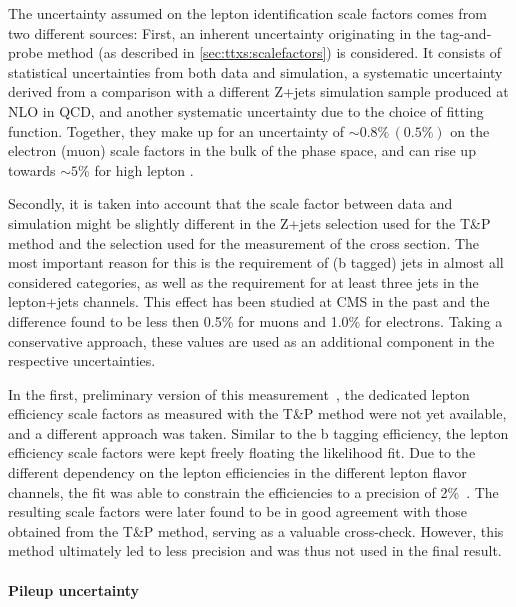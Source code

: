 The uncertainty assumed on the lepton identification scale factors comes from two different sources: First, an inherent uncertainty originating in the tag-and-probe method (as described in \cref{sec:ttxs:scalefactors}) is considered. It consists of statistical uncertainties from both data and simulation, a systematic uncertainty derived from a comparison with a different Z+jets simulation sample produced at NLO in QCD, and another systematic uncertainty due to the choice of fitting function. Together, they make up for an uncertainty of $\sim 0.8\% \, (0.5\%)$ on the electron (muon) scale factors in the bulk of the phase space, and can rise up towards $\sim 5\%$ for high lepton \pt.

Secondly, it is taken into account that the scale factor between data and simulation might be slightly different in the Z+jets selection used for the T\&P method and the \ttbar selection used for the measurement of the cross section. The most important reason for this is the requirement of (b tagged) jets in almost all considered categories, as well as the requirement for at least three jets in the lepton+jets channels. 
This effect has been studied at CMS in the past and the difference found to be less then 0.5\% for muons and 1.0\% for electrons. Taking a conservative approach, these values are used as an additional component in the respective uncertainties.

In the first, preliminary version of this measurement~\cite{CMS:TOP-22-012-PAS}, the dedicated lepton efficiency scale factors as measured with the T\&P method were not yet available, and a different approach was taken. Similar to the b tagging efficiency, the lepton efficiency scale factors were kept freely floating the likelihood fit. Due to the different dependency on the lepton efficiencies in the different lepton flavor channels, the fit was able to constrain the efficiencies to a precision of 2\%~\cite{CMS:TOP-22-012}. The resulting scale factors were later found to be in good agreement with those obtained from the T\&P method, serving as a valuable cross-check. However, this method ultimately led to less precision and was thus not used in the final result.

\paragraph{Pileup uncertainty}


